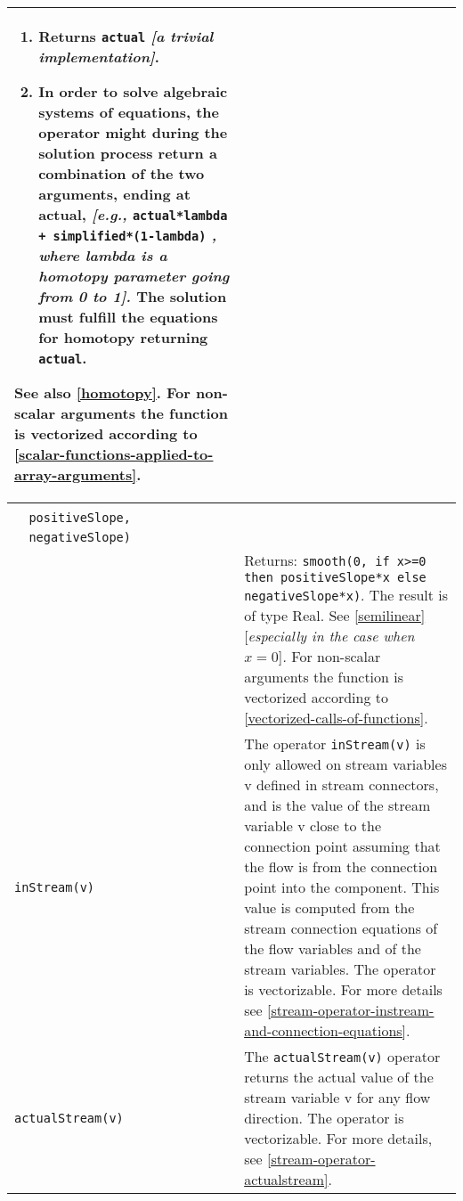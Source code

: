 \begin{longtable}{|p{5.1cm}|p{8cm}|}
\begin{enumerate}
\item
  Returns \lstinline!actual! \emph{{[}a trivial implementation{]}}.
\item
  In order to solve algebraic systems of equations, the operator might
  during the solution process return a combination of the two arguments,
  ending at actual, \emph{{[}e.g.,}
  \lstinline!actual*lambda + simplified*(1-lambda)! \emph{,
  where lambda is a homotopy parameter going from 0 to 1{]}.}
  The solution must fulfill the equations for homotopy returning
  \lstinline!actual!.
\end{enumerate}

See also \autoref{homotopy}. For non-scalar arguments the function is
vectorized according to \autoref{scalar-functions-applied-to-array-arguments}.\\ 
\hline

\begin{tabular}{@{}p{5.1cm}@{}}
\lstinline!semiLinear(x,!\\
\lstinline!  positiveSlope,!\\
\lstinline!  negativeSlope)!\\ 
\end{tabular}& 
Returns:
\lstinline!smooth(0, if x>=0 then positiveSlope*x else negativeSlope*x)!.
The result is of type Real. See \autoref{semilinear} {[}\emph{especially in
the case when $x = 0$}{]}\emph{.} For non-scalar arguments the function is
vectorized according to \autoref{vectorized-calls-of-functions}.\\ 
\hline

\lstinline!inStream(v)! & The operator \lstinline!inStream(v)! is only allowed on stream
variables v defined in stream connectors, and is the value of the stream
variable v close to the connection point assuming that the flow is from
the connection point into the component. This value is computed from the
stream connection equations of the flow variables and of the stream
variables. The operator is vectorizable. For more details see \autoref{stream-operator-instream-and-connection-equations}.\\ 
\hline

\lstinline!actualStream(v)! & The \lstinline!actualStream(v)! operator returns the actual value
of the stream variable v for any flow direction. The operator is
vectorizable. For more details, see \autoref{stream-operator-actualstream}.\\ 
\hline


\end{longtable}
